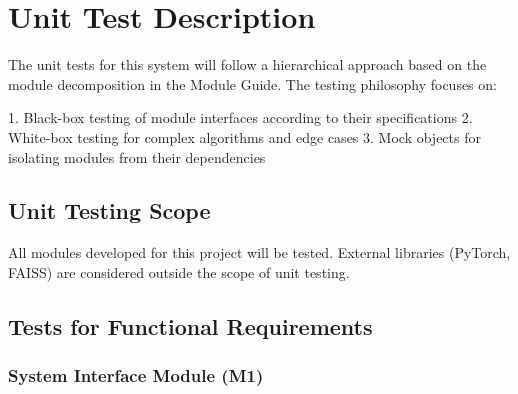 \documentclass[12pt, titlepage]{article}
\begin{document}
\section{Unit Test Description}\label{UnitTest}

The unit tests for this system will follow a hierarchical approach based on the module decomposition in the Module Guide. The testing philosophy focuses on:

1. Black-box testing of module interfaces according to their specifications
2. White-box testing for complex algorithms and edge cases
3. Mock objects for isolating modules from their dependencies

\subsection{Unit Testing Scope}
All modules developed for this project will be tested. External libraries (PyTorch, FAISS) are considered outside the scope of unit testing.

\subsection{Tests for Functional Requirements}

\subsubsection{System Interface Module (M1)}
\end{document}
